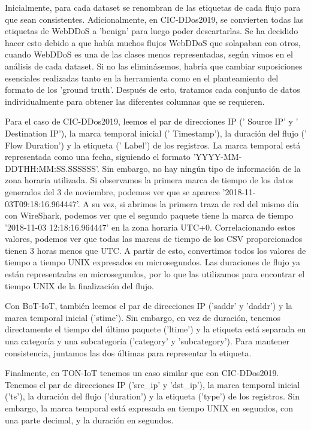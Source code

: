 Inicialmente, para cada dataset se renombran de las etiquetas de cada flujo para que sean consistentes. Adicionalmente, en CIC-DDos2019, se convierten todas las etiquetas de WebDDoS a 'benign' para luego poder descartarlas. Se ha decidido hacer esto debido a que había muchos flujos WebDDoS que solapaban con otros, cuando WebDDoS es una de las clases menos representadas, según vimos en el análisis de cada dataset. Si no las eliminásemos, habría que cambiar suposiciones esenciales realizadas tanto en la herramienta como en el planteamiento del formato de los 'ground truth'. Después de esto, tratamos cada conjunto de datos individualmente para obtener las diferentes columnas que se requieren.

Para el caso de CIC-DDos2019, leemos el par de direcciones IP (' Source IP' y ' Destination IP'), la marca temporal inicial (' Timestamp'), la duración del flujo (' Flow Duration') y la etiqueta (' Label') de los registros. La marca temporal está representada como una fecha, siguiendo el formato 'YYYY-MM-DDTHH:MM:SS.SSSSSS'. Sin embargo, no hay ningún tipo de información de la zona horaria utilizada. Si observamos la primera marca de tiempo de los datos generados del 3 de noviembre, podemos ver que se aparece '2018-11-03T09:18:16.964447'. A su vez, si abrimos la primera traza de red del mismo día con WireShark, podemos ver que el segundo paquete tiene la marca de tiempo '2018-11-03 12:18:16.964447' en la zona horaria UTC+0. Correlacionando estos valores, podemos ver que todas las marcas de tiempo de los CSV proporcionados tienen 3 horas menos que UTC. A partir de esto, convertimos todos los valores de tiempo a tiempo UNIX expresados en microsegundos. Las duraciones de flujo ya están representadas en microsegundos, por lo que las utilizamos para encontrar el tiempo UNIX de la finalización del flujo.

Con BoT-IoT, también leemos el par de direcciones IP ('saddr' y 'daddr') y la marca temporal inicial ('stime'). Sin embargo, en vez de duración, tenemos directamente el tiempo del último paquete ('ltime') y la etiqueta está separada en una categoría y una subcategoría ('category' y 'subcategory'). Para mantener consistencia, juntamos las dos últimas para representar la etiqueta.

Finalmente, en TON-IoT tenemos un caso similar que con CIC-DDos2019. Tenemos el par de direcciones IP  ('src\_ip' y 'dst\_ip'), la marca temporal inicial ('ts'), la duración del flujo ('duration') y la etiqueta ('type') de los registros. Sin embargo, la marca temporal está expresada en tiempo UNIX en segundos, con una parte decimal, y la duración en segundos.

